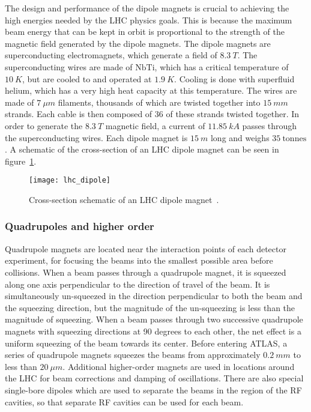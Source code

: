 The design and performance of the dipole magnets is crucial to achieving the high energies needed by the LHC physics goals.
This is because the maximum beam energy that can be kept in orbit is proportional to the strength of the magnetic field generated by the dipole magnets.
The dipole magnets are superconducting electromagnets, which generate a field of $8.3~T$.
The superconducting wires are made of $\mathrm{NbTi}$, which has a critical temperature of $10~K$,
but are cooled to and operated at $1.9~K$.
Cooling is done with superfluid helium, which has a very high heat capacity at this temperature.
The wires are made of $7~\mu m$ filaments, thousands of which are twisted together into $15~mm$ strands.
Each cable is then composed of 36 of these strands twisted together.
In order to generate the $8.3~T$ magnetic field, a current of $11.85~kA$ passes through the superconducting wires.
Each dipole magnet is $15~m$ long and weighs $35~\text{tonnes}$.
A schematic of the cross-section of an LHC dipole magnet can be seen in figure~\ref{fig:lhc_dipole}.

\begin{figure}[!ht]\centering
\texttt{[image: lhc\_dipole]}
\caption{Cross-section schematic of an LHC dipole magnet~\cite{lhc-dipole}.}
\label{fig:lhc_dipole}
\end{figure}

\subsubsection{Quadrupoles and higher order}

Quadrupole magnets are located near the interaction points of each detector experiment,
for focusing the beams into the smallest possible area before collisions.
When a beam passes through a quadrupole magnet, it is squeezed along one axis perpendicular to the direction of travel of the beam.
It is simultaneously un-squeezed in the direction perpendicular to both the beam and the squeezing direction,
but the magnitude of the un-squeezing is less than the magnitude of squeezing.
When a beam passes through two successive quadrupole magnets with squeezing directions at 90 degrees to each other,
the net effect is a uniform squeezing of the beam towards its center.
Before entering ATLAS, a series of quadrupole magnets squeezes the beams from approximately $0.2~mm$ to less than $20~\mu m$.
Additional higher-order magnets are used in locations around the LHC for beam corrections and damping of oscillations.
There are also special single-bore dipoles which are used to separate the beams in the region of the RF cavities,
so that separate RF cavities can be used for each beam.

